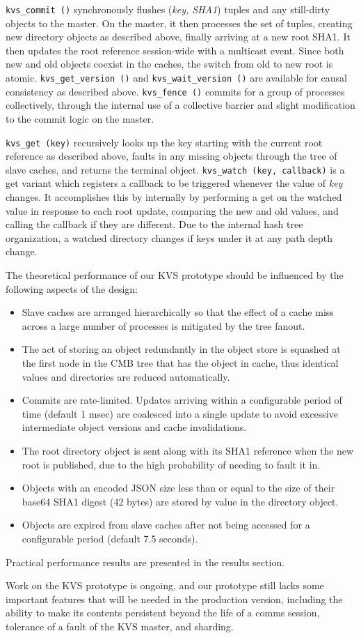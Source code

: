 {\tt kvs\_commit ()} synchronously flushes ({\em key, SHA1}) tuples
and any still-dirty objects to the master.  On the master, it then
processes the set of tuples, creating new directory objects as described
above, finally arriving at a new root SHA1.  It then updates the 
root reference session-wide with a multicast event.
Since both new and old objects coexist in the caches, the switch from old
to new root is atomic.
{\tt kvs\_get\_version ()} and {\tt kvs\_wait\_version ()} are available
for causal consistency as described above.
{\tt kvs\_fence ()} commits for a group of processes collectively,
through the internal use of a collective barrier
and slight modification to the commit logic on the master.

{\tt kvs\_get (key)} recursively looks up the key starting with the
current root reference as described above, faults in any missing objects
through the tree of slave caches, and returns the terminal object.
{\tt kvs\_watch (key, callback)} is a get variant which registers a
callback to be triggered whenever the value of {\em key} changes.
It accomplishes this by internally by performing a get on the watched
value in response to each root update, comparing the new
and old values, and calling the callback if they are different.
Due to the internal hash tree organization, a watched directory changes
if keys under it at any path depth change.

The theoretical performance of our KVS prototype should be influenced by
the following aspects of the design:
\begin{itemize}
\item{Slave caches are arranged hierarchically so that the effect of a
cache miss across a large number of processes is mitigated by the tree
fanout.}
\item{The act of storing an object redundantly in the object store
is squashed at the first node in the CMB tree that has the object
in cache, thus identical values and directories are reduced automatically.}
\item{Commits are rate-limited.  Updates arriving within a configurable
period of time (default 1 msec) are coalesced into a single update to
avoid excessive intermediate object versions and cache invalidations.}
\item{The root directory object is sent along with its SHA1 reference when the
new root is published, due to the high probability of needing to fault it in.}
\item{Objects with an encoded JSON size less than or equal to the size
of their base64 SHA1 digest (42 bytes) are stored by value in the directory
object.}
\item{Objects are expired from slave caches after not being accessed for
a configurable period (default 7.5 seconds).}
\end{itemize}
Practical performance results are presented in the results section.

Work on the KVS prototype is ongoing, and our prototype still lacks some
important features that will be needed in the production version,
including the ability to make its contents persistent beyond the
life of a comms session,
tolerance of a fault of the KVS master,
and sharding.
